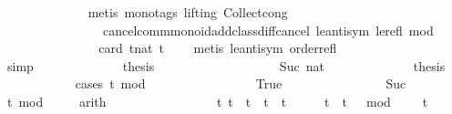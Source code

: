 \begin{isabellebody}
\ \ \ \ \ \ \ \ \ \ \ \ \isamarkupfalse%
\ {\isacharparenleft}metis\ {\isacharparenleft}mono{\isacharunderscore}tags{\isacharcomma}\ lifting{\isacharparenright}\ Collect{\isacharunderscore}cong\isanewline
\ \ \ \ \ \ \ \ \ \ \ \ \ \ \ \ cancel{\isacharunderscore}comm{\isacharunderscore}monoid{\isacharunderscore}add{\isacharunderscore}class{\isachardot}diff{\isacharunderscore}cancel\ le{\isacharunderscore}antisym\ le{\isacharunderscore}refl\ mod{\isacharunderscore}{}{\isacharparenright}\isanewline
\ \ \ \ \ \ \ \ \ \ \isamarkupfalse%
\ \isamarkupfalse%
\ {\isacartoucheopen}{\isachardot}{\isachardot}{\isachardot}\ {\isacharequal}\ card\ {\isacharbraceleft}t{\isacharcolon}{\isacharcolon}nat{\isachardot}\ t\ {\isacharequal}\ {}{\isacharbraceright}{\isacartoucheclose}\ \isamarkupfalse%
\ {\isacharparenleft}metis\ le{\isacharunderscore}antisym\ order{\isacharunderscore}refl{\isacharparenright}\isanewline
\ \ \ \ \ \ \ \ \ \ \isamarkupfalse%
\ \isamarkupfalse%
\ {\isacartoucheopen}{\isachardot}{\isachardot}{\isachardot}\ {\isacharequal}\ {}{\isacartoucheclose}\ \isamarkupfalse%
\ simp\isanewline
\ \ \ \ \ \ \ \ \ \ \isamarkupfalse%
\ \isamarkupfalse%
\ {\isacharquery}thesis\ \isacommand{{\isachardot}}\isamarkupfalse%
\ \isanewline
\ \ \ \ \ \ \isamarkupfalse%
\isanewline
\ \ \ \ \ \ \ \ \isamarkupfalse%
\ {\isacharparenleft}Suc\ nat{\isacharparenright}\isanewline
\ \ \ \ \ \ \ \ \ \ \isamarkupfalse%
\ \isamarkupfalse%
\ {\isacharquery}thesis\isanewline
\ \ \ \ \ \ \ \ \ \ \isamarkupfalse%
\ {\isacharparenleft}cases\ {\isacartoucheopen}{\isacharparenleft}t\ mod\ {}\ {\isacharequal}\ {}{\isacartoucheclose}{\isacharparenright}\isanewline
\ \ \ \ \ \ \ \ \ \ \ \ \isamarkupfalse%
\ True\isanewline
\ \ \ \ \ \ \ \ \ \ \ \ \ \ \isamarkupfalse%
\ Suc\ \isamarkupfalse%
\ {\isacartoucheopen}t\ mod\ {}\ {\isasymnoteq}\ {}{\isacartoucheclose}\ \isamarkupfalse%
\ arith\ \isanewline
\ \ \ \ \ \ \ \ \ \ \ \ \ \ \isamarkupfalse%
\ {\isacartoucheopen}{\isacharbraceleft}t{\isachardot}\ {\isacharparenleft}t\ {\isacharequal}\ t\ {\isasymor}\ t\ {\isacharequal}\ t\ {\isacharplus}\ {}{\isacharparenright}\ {\isasymand}\ {}\ {\isasymle}\ t\ {\isasymand}\ {\isacharparenleft}t\ {\isacharminus}\ {}{\isacharparenright}\ mod\ {}\ {\isacharequal}\ {}{\isacharbraceright}\ {\isacharequal}\ {\isacharbraceleft}t\isanewline

\end{isabellebody}
